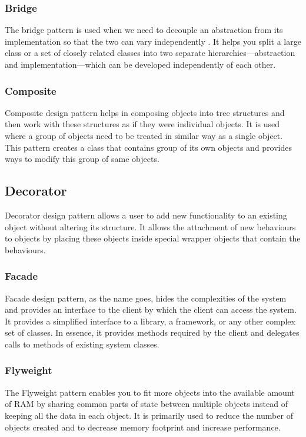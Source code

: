 \documentclass[sigplan,12pt,nonacm=true,review=false]{acmart}
\begin{document}
\subsubsection{Bridge}
The bridge pattern is used when we need to decouple \cite{wendorff_assessment_2001} an abstraction from its implementation so that the two can vary independently \cite{tichy_catalogue_1997}. It helps you split a large class or a set of closely related classes into two separate hierarchies—abstraction and implementation—which can be developed independently of each other. 

\subsubsection{Composite}
Composite design pattern helps in composing objects into tree structures and then work with these structures as if they were individual objects. It is used where a group of objects need to be treated in similar way as a single object. This pattern creates a class that contains group of its own objects and provides ways to modify this group of same objects. 

\subsection{Decorator}
Decorator design pattern allows a user to add new functionality to an existing object without altering its structure. It allows the attachment of new behaviours to objects by placing these objects inside special wrapper objects that contain the behaviours. 

\subsubsection{Facade}
Facade design pattern, as the name goes, hides the complexities of the system and provides an interface to the client by which the client can access the system. It provides a simplified interface to a library, a framework, or any other complex set of classes. In essence, it provides methods required by the client and delegates calls to methods of existing system classes. 

\subsubsection{Flyweight}
The Flyweight pattern enables you to fit more objects into the available amount of RAM by sharing common parts of state between multiple objects instead of keeping all the data in each object. It is primarily used to reduce the number of objects created and to decrease memory footprint and increase performance.
\end{document}
